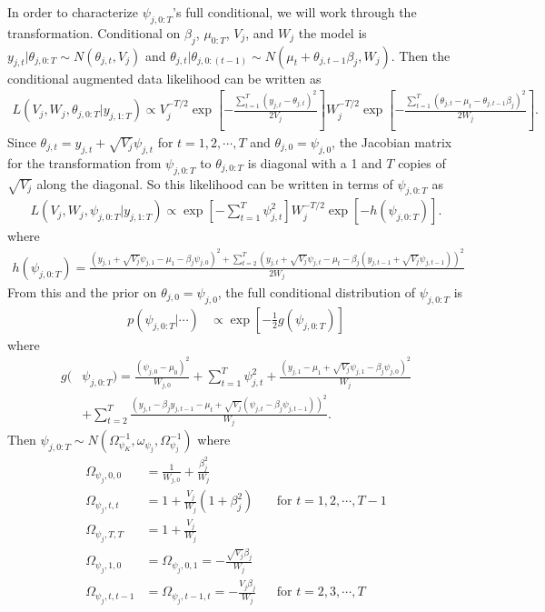 \documentclass[graybox]{svmult}
\begin{document}
In order to characterize $\psi_{j,0:T}$'s full conditional, we will work through the transformation. Conditional on $\beta_j$, $\mu_{0:T}$, $V_j$, and $W_j$ the model is $y_{j,t}|\theta_{j,0:T}\sim N(\theta_{j,t},V_j)$ and $\theta_{j,t}|\theta_{j,0:(t-1)}\sim N(\mu_t + \theta_{j,t-1}\beta_j,W_j)$. Then the conditional augmented data likelihood can be written as
\begin{align*}
L(V_j,W_j,\theta_{j,0:T}|y_{j,1:T}) \propto V_j^{-T/2}\exp\left[-\frac{\sum_{t=1}^T(y_{j,t}-\theta_{j,t})^2}{2V_j}\right] W_j^{-T/2}\exp\left[-\frac{\sum_{t=1}^T(\theta_{j,t}-\mu_t-\theta_{j,t-1}\beta_j)^2}{2W_j}\right].
\end{align*}
Since $\theta_{j,t}=y_{j,t} + \sqrt{V_j}\psi_{j,t}$ for $t=1,2,\cdots,T$ and $\theta_{j,0}=\psi_{j,0}$, the Jacobian matrix for the transformation from $\psi_{j,0:T}$ to $\theta_{j,0:T}$ is diagonal with a 1 and $T$ copies of $\sqrt{V_j}$ along the diagonal. So this likelihood can be written in terms of $\psi_{j,0:T}$ as
\begin{align*}
L(V_j,W_j,\psi_{j,0:T}|y_{j,1:T}) \propto \exp\left[-\sum_{t=1}^T\psi_{j,t}^2\right] W_j^{-T/2}\exp\left[-h(\psi_{j,0:T})\right].
\end{align*}
where
\begin{align*}
h(\psi_{j,0:T}) = \frac{(y_{j,1} + \sqrt{V_j}\psi_{j,1} - \mu_1 - \beta_j\psi_{j,0})^2 +  \sum_{t=2}^T(y_{j,t} + \sqrt{V_j}\psi_{j,t}-\mu_t-\beta_j(y_{j,t-1} + \sqrt{V_j}\psi_{j,t-1}))^2}{2W_j}
\end{align*}
From this and the prior on $\theta_{j,0}=\psi_{j,0}$, the full conditional distribution of $\psi_{j,0:T}$ is
\begin{align*}
p(\psi_{j,0:T}|\cdots)&\propto \exp\left[-\frac{1}{2}g(\psi_{j,0:T})\right]
\end{align*}
where
\begin{align*}
g(&\psi_{j,0:T}) = \frac{(\psi_{j,0} - \mu_0)^2}{W_{j,0}} + \sum_{t=1}^T\psi_{j,t}^2 + \frac{(y_{j,1} - \mu_1 + \sqrt{V_j}\psi_{j,1} - \beta_j\psi_{j,0})^2}{W_j}\\  
&+ \sum_{t=2}^T\frac{(y_{j,t} - \beta_jy_{j,t-1} - \mu_t + \sqrt{V_j}(\psi_{j,t} - \beta_j\psi_{j,t-1}))^2}{W_j}.
\end{align*}
Then $\psi_{j,0:T}\sim N(\Omega_{\psi_K}^{-1},\omega_{\psi_j},\Omega_{\psi_j}^{-1})$ where
\begin{align*}
\Omega_{\psi_j,0,0}&=\frac{1}{W_{j,0}} + \frac{\beta_j^2}{W_j}&&\\
\Omega_{\psi_j,t,t}&=1 + \frac{V_j}{W_j}(1 + \beta_j^2)&&\mbox{for } t=1,2,\cdots,T-1\\
\Omega_{\psi_j,T,T}&=1 + \frac{V_j}{W_j}&&\\
\Omega_{\psi_j,1,0}&=\Omega_{\psi_j,0,1}=-\frac{\sqrt{V_j}\beta_j}{W_j}&&\\
\Omega_{\psi_j,t,t-1}&=\Omega_{\psi_j,t-1,t}=-\frac{V_j\beta_j}{W_j}&&\mbox{for } t=2,3,\cdots,T
\end{align*}
\end{document}
